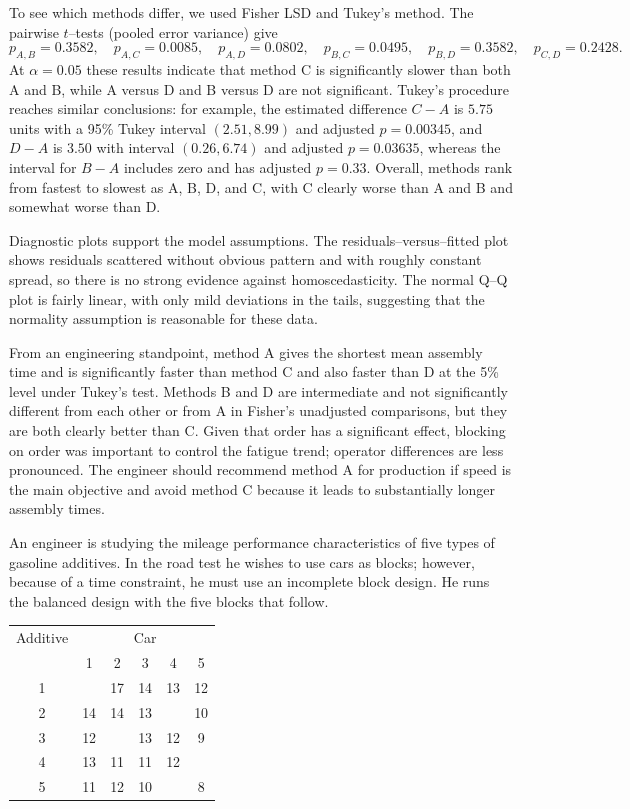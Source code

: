 \documentclass[answers,12pt,addpoints]{exam}
\begin{document}
\begin{questions}
\begin{solution}
To see which methods differ, we used Fisher LSD and Tukey’s method. The pairwise
$t$–tests (pooled error variance) give
\[
p_{A,B}=0.3582,\quad
p_{A,C}=0.0085,\quad
p_{A,D}=0.0802,\quad
p_{B,C}=0.0495,\quad
p_{B,D}=0.3582,\quad
p_{C,D}=0.2428.
\]
At $\alpha = 0.05$ these results indicate that method C is significantly slower
than both A and B, while A versus D and B versus D are not significant. Tukey’s
procedure reaches similar conclusions: for example, the estimated difference
$C-A$ is $5.75$ units with a 95\% Tukey interval $(2.51, 8.99)$ and adjusted
$p = 0.00345$, and $D-A$ is $3.50$ with interval $(0.26, 6.74)$ and adjusted
$p = 0.03635$, whereas the interval for $B-A$ includes zero and has adjusted
$p = 0.33$. Overall, methods rank from fastest to slowest as A, B, D, and C, with
C clearly worse than A and B and somewhat worse than D.

Diagnostic plots support the model assumptions. The residuals–versus–fitted plot
shows residuals scattered without obvious pattern and with roughly constant spread,
so there is no strong evidence against homoscedasticity. The normal Q–Q plot is
fairly linear, with only mild deviations in the tails, suggesting that the normality
assumption is reasonable for these data.

From an engineering standpoint, method A gives the shortest mean assembly time and
is significantly faster than method C and also faster than D at the 5\% level
under Tukey’s test. Methods B and D are intermediate and not significantly
different from each other or from A in Fisher’s unadjusted comparisons, but they
are both clearly better than C. Given that order has a significant effect, blocking
on order was important to control the fatigue trend; operator differences are less
pronounced. The engineer should recommend method A for production if speed is the
main objective and avoid method C because it leads to substantially longer assembly
times.
\end{solution}

 An engineer is studying the mileage performance characteristics of
five types of gasoline additives. In the road test he wishes to use cars as blocks;
however, because of a time constraint, he must use an incomplete block design.
He runs the balanced design with the five blocks that follow.

\begin{center}
\begin{tabular}{c|ccccc}
\hline
Additive & \multicolumn{5}{c}{Car} \\
 & 1 & 2 & 3 & 4 & 5 \\
\hline
1 &     & 17 & 14 & 13 & 12 \\
2 & 14  & 14 & 13 &    & 10 \\
3 & 12  &    & 13 & 12 &  9 \\
4 & 13  & 11 & 11 & 12 &    \\
5 & 11  & 12 & 10 &    &  8 \\
\hline
\end{tabular}
\end{center}


\end{questions}
\end{document}
